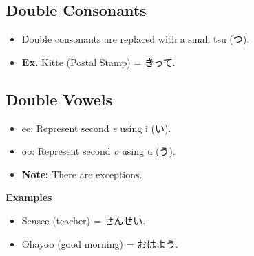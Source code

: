\documentclass{article}
\begin{document}
\begin{CJK}{UTF8}{min}
\clearpage

\subsection{Double Consonants}

\begin{itemize}
\item Double consonants are replaced with a small tsu (つ).
\item {\bf Ex.} Kitte (Postal Stamp) = きって.
\end{itemize}


\subsection{Double Vowels}

\begin{itemize}
\item ee: Represent second {\it e} using i (い).
\item oo: Represent second {\it o} using u (う).
\item {\bf Note:} There are exceptions.
\end{itemize}

{\bf Examples}

\begin{itemize}
\item Sensee (teacher) = せんせい.
\item Ohayoo (good morning) = おはよう.
\end{itemize}

\end{CJK}
\end{document}
